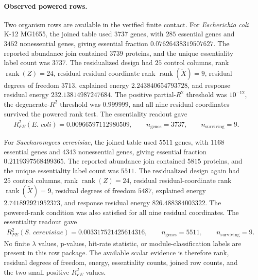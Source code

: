 \paragraph{Observed powered rows.}
Two organism rows are available in the verified finite contact.  For \emph{Escherichia coli} K-12 MG1655, the joined table used $3737$ genes, with $285$ essential genes and $3452$ nonessential genes, giving essential fraction $0.07626438319507627$.  The reported abundance join contained $3739$ proteins, and the unique essentiality label count was $3737$.  The residualized design had $25$ control columns, rank $\operatorname{rank}(Z)=24$, residual residual-coordinate rank $\operatorname{rank}(\widetilde X)=9$, residual degrees of freedom $3713$, explained energy $2.243840654793728$, and response residual energy $232.13814987247684$.  The positive partial-$R^2$ threshold was $10^{-12}$, the degenerate-$R^2$ threshold was $0.999999$, and all nine residual coordinates survived the powered rank test.  The essentiality readout gave
$$
\begin{aligned}
R^2_{FE}(\textit{E. coli}) = 0.00966597112980509,
\qquad n_{\mathrm{genes}} = 3737,
\qquad n_{\mathrm{surviving}} = 9.
\end{aligned}
$$

For \emph{Saccharomyces cerevisiae}, the joined table used $5511$ genes, with $1168$ essential genes and $4343$ nonessential genes, giving essential fraction $0.2119397568499365$.  The reported abundance join contained $5815$ proteins, and the unique essentiality label count was $5511$.  The residualized design again had $25$ control columns, rank $\operatorname{rank}(Z)=24$, residual residual-coordinate rank $\operatorname{rank}(\widetilde X)=9$, residual degrees of freedom $5487$, explained energy $2.741892921952373$, and response residual energy $826.488384003322$.  The powered-rank condition was also satisfied for all nine residual coordinates.  The essentiality readout gave
$$
\begin{aligned}
R^2_{FE}(\textit{S. cerevisiae}) = 0.003317521425614316,
\qquad n_{\mathrm{genes}} = 5511,
\qquad n_{\mathrm{surviving}} = 9.
\end{aligned}
$$
No finite $\lambda$ values, p-values, hit-rate statistic, or module-classification labels are present in this row package.  The available scalar evidence is therefore rank, residual degrees of freedom, energy, essentiality counts, joined row counts, and the two small positive $R^2_{FE}$ values.

